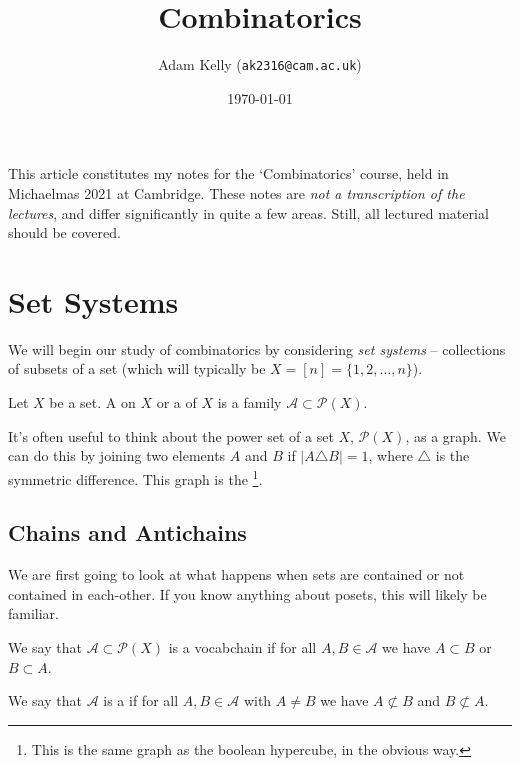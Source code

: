\documentclass[a4paper]{scrartcl}
\title{Combinatorics}
\author{Adam Kelly (\texttt{ak2316@cam.ac.uk})}
\date{\today}
\begin{document}
\maketitle


This article constitutes my notes for the `Combinatorics' course, held in Michaelmas 2021 at Cambridge. These notes are \emph{not a transcription of the lectures}, and differ significantly in quite a few areas. Still, all lectured material should be covered.



\tableofcontents



\section{Set Systems}
 
We will begin our study of combinatorics by considering \emph{set systems} -- collections of subsets of a set (which will typically be $X = [n] = \{1, 2, \dots, n\}$).

\begin{definition}
Let $X$ be a set. A  on $X$ or a  of $X$ is a family $\mathcal{A} \subset \mathcal{P}(X)$.
\end{definition}

It's often useful to think about the power set of a set $X$, $\mathcal{P}(X)$, as a graph. We can do this by joining two elements $A$ and $B$ if $|A \triangle B| = 1$, where $\triangle$ is the symmetric difference.
This graph is the \footnote{This is the same graph as the boolean hypercube, in the obvious way.}.


\subsection{Chains and Antichains}

We are first going to look at what happens when sets are contained or not contained in each-other. If you know anything about posets, this will likely be familiar. 

\begin{definition}
We say that $\mathcal{A} \subset \mathcal{P}(X)$ is a vocab{chain} if for all $A, B \in \mathcal{A}$ we have $A \subset B$ or $B \subset A$.

We say that $\mathcal{A}$ is a  if for all $A, B \in \mathcal{A}$ with $A \neq B$ we have $A \not \subset B$ and $B \not \subset A$.
\end{definition}
\end{document}
